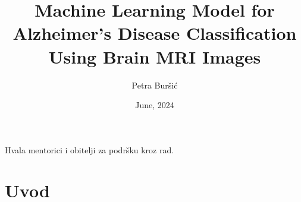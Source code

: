 \documentclass[zavrsnirad]{fer}
\title{Machine Learning Model for Alzheimer's Disease Classification Using Brain MRI Images}
\author{Petra Buršić}
\date{June, 2024}
\begin{document}
\maketitle






\begin{zahvale}
  Hvala mentorici i obitelji za podršku kroz rad.
\end{zahvale}


\tableofcontents


\mainmatter


\chapter{Uvod}
\label{pog:uvod}
\end{document}
